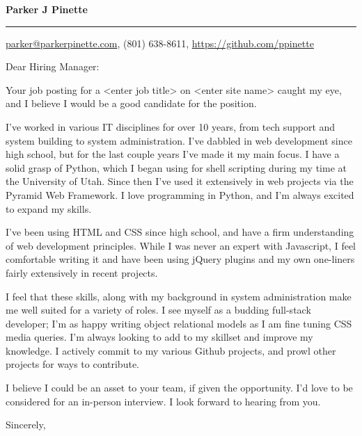\documentclass{letter}
\begin{document}
\signature{Parker J Pinette}
\longindentation=8pt
\let\raggedleft\raggedright
\headsep=20pt

\begin{letter}{}

\begin{flushleft}
 {\large\bf Parker J Pinette}
\end{flushleft}
\medskip\hrule height 1pt
\begin{flushright}
 \hfill \href{mailto:parker@parkerpinette.com}{parker@parkerpinette.com}, (801) 638-8611, \url{https://github.com/ppinette} 
\end{flushright}
\vfill

\opening{Dear Hiring Manager:}

\noindent Your job posting for a <enter job title> on <enter site name> caught my eye, and I believe I would be a good candidate for the position.  

\noindent I've worked in various IT disciplines for over 10 years, from tech support and system building to system administration. I've dabbled in web development since high school, but for the last couple years I've made it my main focus. I have a solid grasp of Python, which I began using for shell scripting during my time at the University of Utah. Since then I've used it extensively in web projects via the Pyramid Web Framework. I love programming in Python, and I'm always excited to expand my skills. 

\noindent I've been using HTML and CSS since high school, and have a firm understanding of web development principles. While I was never an expert with Javascript, I feel comfortable writing it and have been using jQuery plugins and my own one-liners fairly extensively in recent projects. 

\noindent I feel that these skills, along with my background in system administration make me well suited for a variety of roles. I see myself as a budding full-stack developer; I'm as happy writing object relational models as I am fine tuning CSS media queries. I'm always looking to add to my skillset and improve my knowledge. I actively commit to my various Github projects, and prowl other projects for ways to contribute.

\noindent I believe I could be an asset to your team, if given the opportunity. I'd love to be considered for an in-person interview. I look forward to hearing from you.

\closing{Sincerely,}
\end{letter}
\end{document}
